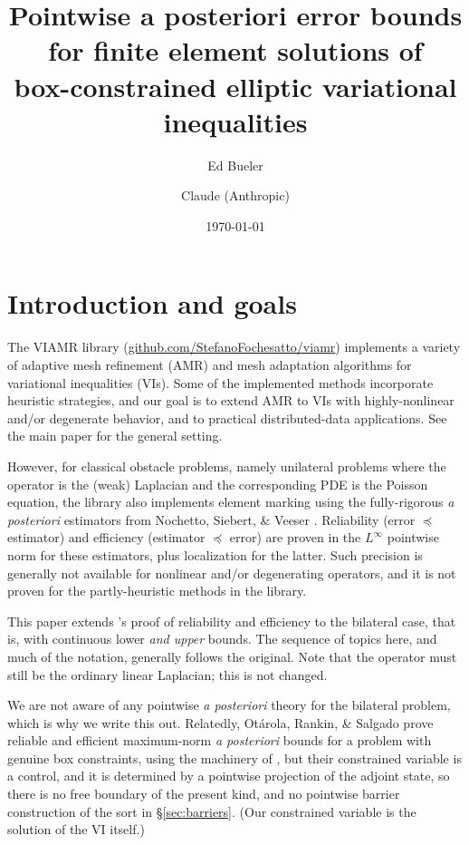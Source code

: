 \documentclass[12pt]{amsart}
\title[Pointwise a posteriori bounds for box-constrained VIs]{Pointwise a posteriori error bounds \\ for finite element solutions of \\ box-constrained elliptic variational inequalities}
\author{Ed Bueler \and Claude (Anthropic)}
\date{\today}
\theoremstyle{definition}
\begin{document}
\maketitle

\section{Introduction and goals} \label{sec:intro}

The VIAMR library (\href{https://github.com/StefanoFochesatto/viamr}{github.com/StefanoFochesatto/viamr}) implements a variety of adaptive mesh refinement (AMR) and mesh adaptation algorithms for variational inequalities (VIs).  Some of the implemented methods incorporate heuristic strategies, and our goal is to extend AMR to VIs with highly-nonlinear and/or degenerate behavior, and to practical distributed-data applications.  See the main paper for the general setting.

However, for classical obstacle problems, namely unilateral problems where the operator is the (weak) Laplacian and the corresponding PDE is the Poisson equation, the library also implements element marking using the fully-rigorous \emph{a posteriori} estimators from Nochetto, Siebert, \& Veeser \cite{NSV03,NSV05}.  Reliability (error $\preceq$ estimator) and efficiency (estimator $\preceq$ error) are proven in the $L^\infty$ pointwise norm for these estimators, plus localization for the latter.  Such precision is generally not available for nonlinear and/or degenerating operators, and it is not proven for the partly-heuristic methods in the library.

This paper extends \cite{NSV03}'s proof of reliability and efficiency to the bilateral case, that is, with continuous lower \emph{and upper} bounds.  The sequence of topics here, and much of the notation, generally follows the original.  Note that the operator must still be the ordinary linear Laplacian; this is not changed.

We are not aware of any pointwise \emph{a posteriori} theory for the bilateral problem, which is why we write this out.  Relatedly, Ot\'arola, Rankin, \& Salgado \cite{Otarolaetal2019} prove reliable and efficient maximum-norm \emph{a posteriori} bounds for a problem with genuine box constraints, using the machinery of \cite{NSV03}, but their constrained variable is a control, and it is determined by a pointwise projection of the adjoint state, so there is no free boundary of the present kind, and no pointwise barrier construction of the sort in \S \ref{sec:barriers}.  (Our constrained variable is the solution of the VI itself.)
\end{document}

